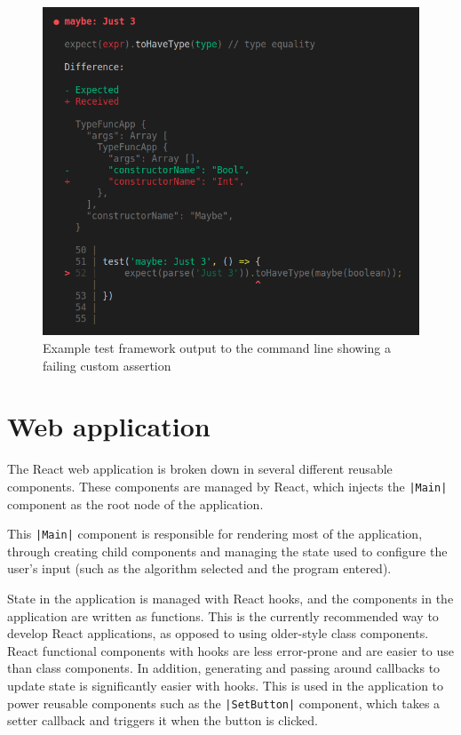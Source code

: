 \documentclass[a4paper,fleqn,oneside,12pt]{report}
\begin{document}
{\centering \begin{figure}[h!]
  \centering
  \includegraphics[width=0.769\linewidth]{images/image9.png}
  \caption{Example test framework output to the command line showing a failing custom assertion}
\end{figure} \par}
\section{Web application}\label{id:h.jqmg1n3w35mp}
The React web application is broken down in several different reusable components. These components are managed by React, which injects the \texttt{|Main|} component as the root node of the application.

This \texttt{|Main|} component is responsible for rendering most of the application, through creating child components and managing the state used to configure the user’s input (such as the algorithm selected and the program entered).

State in the application is managed with React hooks, and the components in the application are written as functions. This is the currently recommended way to develop React applications, as opposed to using older-style class components. React functional components with hooks are less error-prone and are easier to use than class components. In addition, generating and passing around callbacks to update state is significantly easier with hooks. This is used in the application to power reusable components such as the \texttt{|SetButton|} component, which takes a setter callback and triggers it when the button is clicked.
\end{document}
